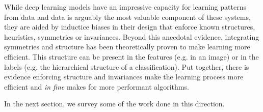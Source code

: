 


While deep learning models have an impressive capacity for learning patterns from data and data is arguably the most valuable component of these systems, they are aided by inductice biases in their design that enforce known structures, heuristics, symmetries or invariances. Beyond this anecdotal evidence, integrating symmetries and structure has been theoretically proven to make learning more efficient. This structure can be present in the features (e.g. in an image) or in the labels (e.g. the hierarchical structure of a classification). Put together, there is evidence enforcing structure and invariances make the learning process more efficient and \emph{in fine} makes for more performant algorithms.

In the next section, we survey some of the work done in this direction.

